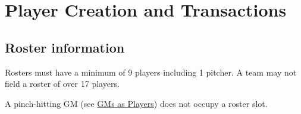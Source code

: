 
\section{Player Creation and Transactions}

\subsection{Roster information}
\begin{deepEnumerate}
	\item Rosters must have a minimum of 9 players including 1 pitcher.	A team may not field a roster of over 17 players.
	\begin{deepEnumerate}
		\item A pinch-hitting GM (see \hyperref[sec:GMs as Players]{GMs as Players}) does not occupy a roster slot.
	\end{deepEnumerate}
\end{deepEnumerate}


